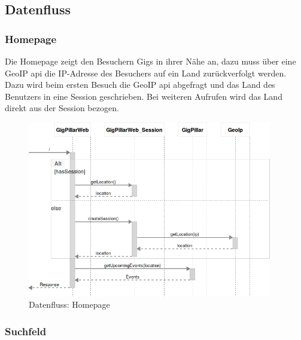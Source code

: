 \subsection{Datenfluss}\label{datenfluss}

\subsubsection{Homepage}\label{datenfluss-homepage}

Die Homepage zeigt den Besuchern Gigs in ihrer Nähe an, dazu muss über eine
GeoIP \acrshort{api} die IP-Adresse des Besuchers auf ein Land zurückverfolgt werden.
Dazu wird beim ersten Besuch die GeoIP \acrshort{api} abgefragt und das Land des Benutzers
in eine Session geschrieben. Bei weiteren Aufrufen wird das Land direkt aus der
Session bezogen.

%
%

\begin{figure}[!htb]
  \centering
  \includegraphics[width=0.95\textwidth]{konzept/datenfluss-homepage.png}
  \caption{Datenfluss: Homepage}
\end{figure}

\clearpage
\subsubsection{Suchfeld}\label{datenfluss-suchfeld}

